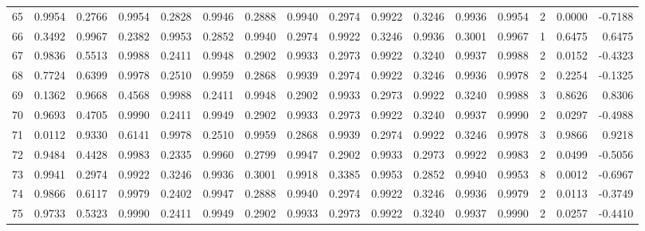 \begin{tabular}{lrrrrrrrrrrrrrrr}
65  &      0.9954 &  0.2766 &  0.9954 &  0.2828 &  0.9946 &  0.2888 &  0.9940 &  0.2974 &  0.9922 &  0.3246 &   0.9936 &     0.9954 &      2 &                    0.0000 &                    -0.7188 \\
66  &      0.3492 &  0.9967 &  0.2382 &  0.9953 &  0.2852 &  0.9940 &  0.2974 &  0.9922 &  0.3246 &  0.9936 &   0.3001 &     0.9967 &      1 &                    0.6475 &                     0.6475 \\
67  &      0.9836 &  0.5513 &  0.9988 &  0.2411 &  0.9948 &  0.2902 &  0.9933 &  0.2973 &  0.9922 &  0.3240 &   0.9937 &     0.9988 &      2 &                    0.0152 &                    -0.4323 \\
68  &      0.7724 &  0.6399 &  0.9978 &  0.2510 &  0.9959 &  0.2868 &  0.9939 &  0.2974 &  0.9922 &  0.3246 &   0.9936 &     0.9978 &      2 &                    0.2254 &                    -0.1325 \\
69  &      0.1362 &  0.9668 &  0.4568 &  0.9988 &  0.2411 &  0.9948 &  0.2902 &  0.9933 &  0.2973 &  0.9922 &   0.3240 &     0.9988 &      3 &                    0.8626 &                     0.8306 \\
70  &      0.9693 &  0.4705 &  0.9990 &  0.2411 &  0.9949 &  0.2902 &  0.9933 &  0.2973 &  0.9922 &  0.3240 &   0.9937 &     0.9990 &      2 &                    0.0297 &                    -0.4988 \\
71  &      0.0112 &  0.9330 &  0.6141 &  0.9978 &  0.2510 &  0.9959 &  0.2868 &  0.9939 &  0.2974 &  0.9922 &   0.3246 &     0.9978 &      3 &                    0.9866 &                     0.9218 \\
72  &      0.9484 &  0.4428 &  0.9983 &  0.2335 &  0.9960 &  0.2799 &  0.9947 &  0.2902 &  0.9933 &  0.2973 &   0.9922 &     0.9983 &      2 &                    0.0499 &                    -0.5056 \\
73  &      0.9941 &  0.2974 &  0.9922 &  0.3246 &  0.9936 &  0.3001 &  0.9918 &  0.3385 &  0.9953 &  0.2852 &   0.9940 &     0.9953 &      8 &                    0.0012 &                    -0.6967 \\
74  &      0.9866 &  0.6117 &  0.9979 &  0.2402 &  0.9947 &  0.2888 &  0.9940 &  0.2974 &  0.9922 &  0.3246 &   0.9936 &     0.9979 &      2 &                    0.0113 &                    -0.3749 \\
75  &      0.9733 &  0.5323 &  0.9990 &  0.2411 &  0.9949 &  0.2902 &  0.9933 &  0.2973 &  0.9922 &  0.3240 &   0.9937 &     0.9990 &      2 &                    0.0257 &                    -0.4410 \\

\end{tabular}
